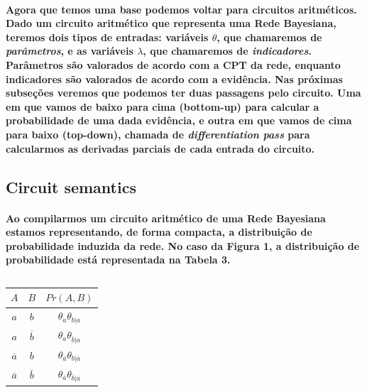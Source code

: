 \documentclass[a4paper,10pt]{article}
\theoremstyle{plain}
\begin{document}
\paragraph{
  Agora que temos uma base podemos voltar para circuitos aritméticos. Dado um circuito aritmético
que representa uma Rede Bayesiana, teremos dois tipos de entradas: variáveis $\theta$, que
chamaremos de \textit{parâmetros}, e as variáveis $\lambda$, que chamaremos de
\textit{indicadores}. Parâmetros são valorados de acordo com a CPT da rede, enquanto indicadores
são valorados de acordo com a evidência. Nas próximas subseções veremos que podemos ter duas
passagens pelo circuito. Uma em que vamos de baixo para cima (bottom-up) para calcular a
probabilidade de uma dada evidência, e outra em que vamos de cima para baixo (top-down), chamada
de \textit{differentiation pass} para calcularmos as derivadas parciais de cada entrada do
circuito.
}

\subsection{Circuit semantics}

\paragraph{
  Ao compilarmos um circuito aritmético de uma Rede Bayesiana estamos representando, de forma
compacta, a distribuição de probabilidade induzida da rede. No caso da Figura 1, a distribuição de
probabilidade está representada na Tabela 3.
}

\setcounter{table}{2}

\begin{table}[h]
\begin{center}
\captionsetup{justification=centering}
\caption{}
\begin{tabular}{c c | c}
$A$ & $B$ & $Pr(A, B)$ \\
\hline
$a$ & $b$ & $\theta_{a}\theta_{b|a}$ \\
$a$ & $\overline{b}$ & $\theta_{a}\theta_{\overline{b}|a}$ \\
$\overline{a}$ & $b$ & $\theta_{\overline{a}}\theta_{b|\overline{a}}$ \\
$\overline{a}$ & $\overline{b}$ & $\theta_{\overline{a}}\theta_{\overline{b}|\overline{a}}$ \\
\end{tabular}
\end{center}
\end{table}
\end{document}

